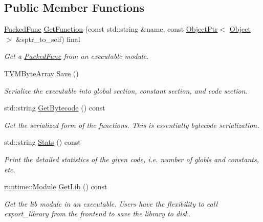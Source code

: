 \subsection*{Public Member Functions}
\begin{DoxyCompactItemize}
\item 
\hyperlink{classtvm_1_1runtime_1_1PackedFunc}{Packed\+Func} \hyperlink{classtvm_1_1runtime_1_1vm_1_1Executable_af052de1610aae050d4363b6625265e86}{Get\+Function} (const std\+::string \&name, const \hyperlink{classtvm_1_1runtime_1_1ObjectPtr}{Object\+Ptr}$<$ \hyperlink{classtvm_1_1runtime_1_1Object}{Object} $>$ \&sptr\+\_\+to\+\_\+self) final
\begin{DoxyCompactList}\small\item\em Get a \hyperlink{classtvm_1_1runtime_1_1PackedFunc}{Packed\+Func} from an executable module. \end{DoxyCompactList}\item 
\hyperlink{structTVMByteArray}{T\+V\+M\+Byte\+Array} \hyperlink{classtvm_1_1runtime_1_1vm_1_1Executable_af949a66ffb86ea941dec43fe95f8d898}{Save} ()
\begin{DoxyCompactList}\small\item\em Serialize the executable into global section, constant section, and code section. \end{DoxyCompactList}\item 
std\+::string \hyperlink{classtvm_1_1runtime_1_1vm_1_1Executable_a83307b4609d46297dfd7fd81e143ea38}{Get\+Bytecode} () const 
\begin{DoxyCompactList}\small\item\em Get the serialized form of the {\ttfamily functions}. This is essentially bytecode serialization. \end{DoxyCompactList}\item 
std\+::string \hyperlink{classtvm_1_1runtime_1_1vm_1_1Executable_a43cc6b3ccb971d2ddf39e2d969d8a43e}{Stats} () const 
\begin{DoxyCompactList}\small\item\em Print the detailed statistics of the given code, i.\+e. number of globls and constants, etc. \end{DoxyCompactList}\item 
\hyperlink{classtvm_1_1runtime_1_1Module}{runtime\+::\+Module} \hyperlink{classtvm_1_1runtime_1_1vm_1_1Executable_ae02ad73c98dd82f842796bfaa1d018a4}{Get\+Lib} () const 
\begin{DoxyCompactList}\small\item\em Get the {\ttfamily lib} module in an executable. Users have the flexibility to call {\ttfamily export\+\_\+library} from the frontend to save the library to disk. \end{DoxyCompactList}\item 

\end{DoxyCompactItemize}
